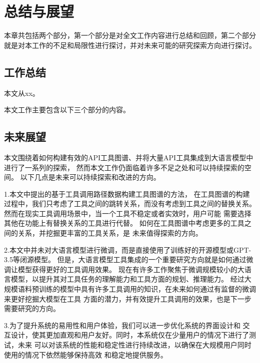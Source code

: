 
\chapter{总结与展望}

\indent 本章共包括两个部分，第一个部分是对全文工作内容进行总结和回顾，第二个部分就是对本工作的不足和局限性进行探讨，并对未来可能的研究探索方向进行探讨。

\section{工作总结}

\indent 本文从xx。

本文工作主要包含以下三个部分的内容。

\section{未来展望}

本文围绕着如何构建有效的API工具图谱、并将大量API工具集成到大语言模型中进行了一系列的探索，
然而本文工作仍面临着许多不足之处和可以持续探索的空间。
以下几点是未来可以持续探索和改进的方向。

\indent 1.本文中提出的基于工具调用路径数据构建工具图谱的方法，
在工具图谱的构建过程中，我们只考虑了工具之间的跳转关系，而没有考虑到工具之间的替换关系。
然而在现实工具调用场景中，当一个工具不稳定或者实效时，用户可能
需要选择其他在功能上有替换关系的工具进行代替。
如何在工具图谱中考虑更多的工具之间的关系，并挖掘更丰富的工具关系，是
未来值得探索的方向。

\indent 2.本文中并未对大语言模型进行微调，而是直接使用了训练好的开源模型或GPT-3.5等闭源模型。
但是，大语言模型工具集成的一个重要研究方向就是如何通过微调让模型获得更好的工具调用效果。
现在有许多工作聚焦于微调规模较小的大语言模型，以提升其对工具任务的理解能力和工具方面的规划、推理能力。
经过大规模语料预训练的模型中具有许多工具调用的知识，在未来如何通过有监督的微调来更好挖掘大模型在工具
方面的潜力，并有效提升工具调用的效果，也是下一步需要研究的方向。

\indent 3.为了提升系统的易用性和用户体验，我们可以进一步优化系统的界面设计和
交互设计，使其更加直观和用户友好。同时，本系统仅在少量用户的情况下进行了测试，未来
可以对该系统的性能和稳定性进行持续改进，以确保在大规模用户同时使用的情况下依然能够保持高效
和稳定地提供服务。
